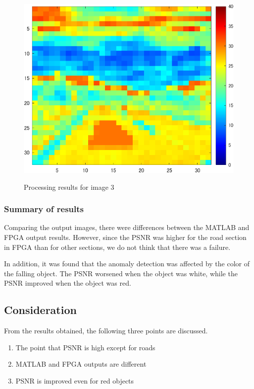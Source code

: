 \documentclass[conference]{IEEEtran}
\begin{document}
\begin{figure}[tb]
\begin{minipage}[t]{0.32\linewidth}
    \label{fig:3-3-3}
  \end{minipage}
  \begin{minipage}[t]{0.32\linewidth}
    \centering
    \includegraphics[width=0.9\columnwidth]{figures/Ex_re6.png}
    \label{fig:3-3-4}
  \end{minipage}
  \caption{Processing results for image 3}
  \label{fig:3-3-1}
\end{figure}

\subsubsection{Summary of results}
Comparing the output images, there were differences between the MATLAB and FPGA output results.
However, since the PSNR was higher for the road section in FPGA than for other sections, we do not think that there was a failure.

In addition, it was found that the anomaly detection was affected by the color of the falling object.
The PSNR worsened when the object was white, while the PSNR improved when the object was red.

\subsection{Consideration}
From the results obtained, the following three points are discussed.
\begin{enumerate}
  \item The point that PSNR is high except for roads \label{3-1-0}
  \item MATLAB and FPGA outputs are different \label{3-1-1}
  \item PSNR is improved even for red objects \label{3-1-2}
\end{enumerate}
\end{document}
